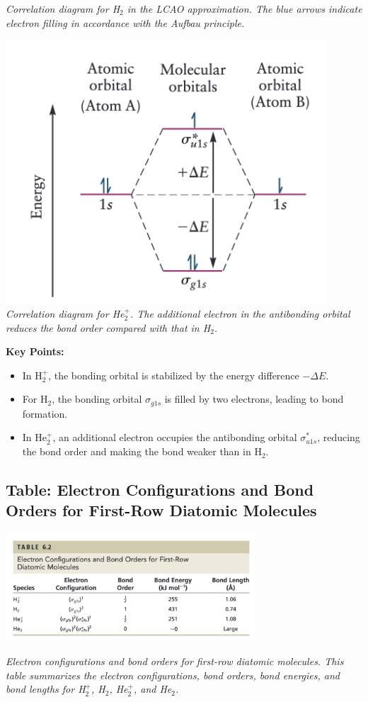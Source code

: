 \documentclass{report}
\begin{document}
\begin{center}
\begin{minipage}{0.32\textwidth}
		\textit{Correlation diagram for H$_2$ in the LCAO approximation. The blue arrows indicate electron filling in accordance with the Aufbau principle.}
	\end{minipage}
	\begin{minipage}{0.32\textwidth}
		\centering
		\includegraphics[width=0.9\textwidth]{5.3.png}
		\textit{Correlation diagram for He$_2^+$. The additional electron in the antibonding orbital reduces the bond order compared with that in H$_2$.}
	\end{minipage}
\end{center}

\textbf{Key Points:}
\begin{itemize}
	\item In H$_2^+$, the bonding orbital is stabilized by the energy difference $-\Delta E$.
	\item For H$_2$, the bonding orbital $\sigma_{g1s}$ is filled by two electrons, leading to bond formation.
	\item In He$_2^+$, an additional electron occupies the antibonding orbital $\sigma^*_{u1s}$, reducing the bond order and making the bond weaker than in H$_2$.
\end{itemize}

\subsection{Table: Electron Configurations and Bond Orders for First-Row Diatomic Molecules}

\begin{center}
	\includegraphics[width=0.7\textwidth]{5.4.png}
\end{center}
\textit{Electron configurations and bond orders for first-row diatomic molecules. This table summarizes the electron configurations, bond orders, bond energies, and bond lengths for H$_2^+$, H$_2$, He$_2^+$, and He$_2$.}
\end{document}
